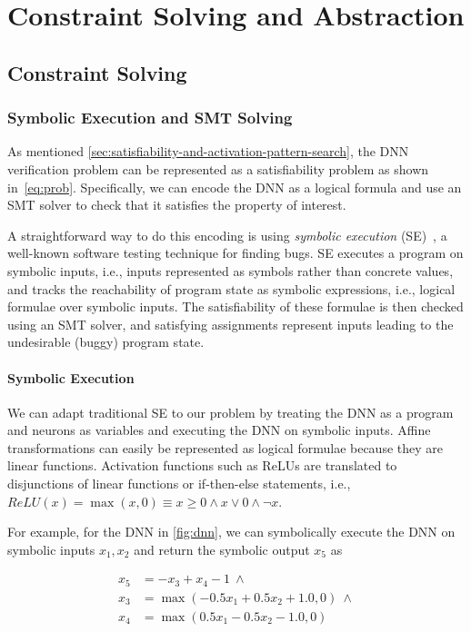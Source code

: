 \documentclass[oneside,11pt,dvipsnames]{book}
\begin{document}
\part{Constraint Solving and Abstraction}


\chapter{Constraint Solving}


\section{Symbolic Execution and SMT Solving}\label{sec:se-smt}

As mentioned \autoref{sec:satisfiability-and-activation-pattern-search}, the DNN verification problem can be represented as a satisfiability problem as shown in~\autoref{eq:prob}.  Specifically, we can encode the DNN as a logical formula and use an SMT solver to check that it satisfies the property of interest.

A straightforward way to do this encoding is using \emph{symbolic execution} (SE)~\cite{FIXME}, a well-known software testing technique for finding bugs.  SE executes a program on symbolic inputs, i.e., inputs represented as symbols rather than concrete values, and tracks the reachability of program state as symbolic expressions, i.e., logical formulae over symbolic inputs. The satisfiability of these formulae is then checked using an SMT solver, and satisfying assignments represent inputs leading to the undesirable (buggy) program state.

\subsection{Symbolic Execution}\label{sec:se}
We can adapt traditional SE to our problem by treating the DNN as a program and neurons as variables and executing the DNN on symbolic inputs. Affine transformations can easily be represented as logical formulae because they are linear functions. Activation functions such as ReLUs are translated to disjunctions of linear functions or if-then-else statements, i.e., $ReLU(x) = \max(x,0) \equiv x \ge 0 \land x \lor 0 \land \neg x$.


For example, for the DNN in \autoref{fig:dnn}, we can symbolically execute the DNN on symbolic inputs $x_1,x_2$ and return the symbolic output $x_5$ as 

\begin{equation}
    \begin{split}
x_5 &= -x_3 + x_4 - 1 ~\land \\
x_3 &= \max(-0.5x_1 + 0.5x_2 + 1.0, 0) ~\land \\
x_4 &= \max(0.5x_1 - 0.5x_2 - 1.0, 0)
    \end{split}
\end{equation}
\end{document}
